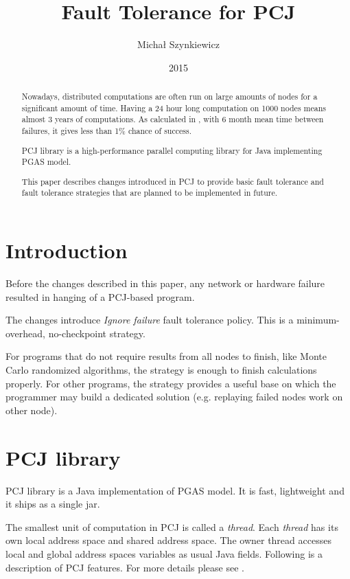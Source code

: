 \documentclass{llncs}
\begin{document}
\title{Fault Tolerance for PCJ}

\author{Michał Szynkiewicz}

\date{2015}
\maketitle

\begin{abstract}

Nowadays, distributed computations are often run on large amounts of nodes for a significant amount of time.
Having a 24 hour long computation on 1000 nodes means almost 3 years of computations.
As calculated in \cite{RX10}, with 6 month mean time between failures, it gives less than 1\% chance of success.

PCJ library is a high-performance parallel computing library for Java implementing PGAS model.

This paper describes changes introduced in PCJ to provide basic fault tolerance and fault tolerance strategies that are planned to be implemented in future.

\end{abstract}

\section{Introduction}
Before the changes described in this paper, any network or hardware failure resulted in hanging of a PCJ-based program.

The changes introduce \emph{Ignore failure} fault tolerance policy.
This is a minimum-overhead, no-checkpoint strategy.

For programs that do not require results from all nodes to finish, like Monte Carlo randomized algorithms, the strategy is enough to finish calculations properly.
For other programs, the strategy provides a useful base on which the programmer may build a dedicated solution (e.g. replaying failed nodes work on other node).


\section{PCJ library}
PCJ library is a Java implementation of PGAS model.
It is fast, lightweight and it ships as a single jar.


The smallest unit of computation in PCJ is called a \emph{thread}. Each \emph{thread} has its own local address space and shared address space.
The owner thread accesses local and global address spaces variables as usual Java fields.
Following is a description of PCJ features. For more details please see \cite{pcj-manual}.
\end{document}
